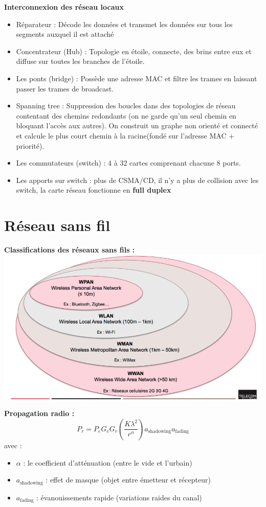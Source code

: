 \documentclass[a4paper,9pt, twocolumn]{article}
\begin{document}
	\textbf{Interconnexion des réseau locaux}
	\begin{itemize}
		\item Réparateur : Décode les données et transmet les données sur tous les segments auxquel il est attaché
		\item Concentrateur (Hub) : Topologie en étoile, connecte, des brins entre eux et diffuse sur toutes les branches de l'étoile.
		\item Les ponts (bridge) : Possède une adresse MAC et filtre les trames en  laissant passer les trames de broadcast.
		\item Spanning tree : Suppression des boucles dans des topologies de réseau contentant des chemins redondants (on ne garde qu'un seul chemin en bloquant l'accès aux autres).
			On construit un graphe non orienté et connecté et calcule le plus court chemin à la racine(fondé sur l'adresse MAC + priorité).
		\item Les commutateurs (switch) : 4 à 32 cartes comprenant chacune 8 ports.
		\item Les apports sur switch : plus de CSMA/CD, il n'y a plus de collision avec les switch, la carte réseau fonctionne en \textbf{full duplex}
	\end{itemize}


\section*{Réseau sans fil}

	\textbf{Classifications des réseaux sans fils :} 
	\includegraphics[scale=0.6]{res.png}
	
	\textbf{Propagation radio : } 
	$$P_{r} = P_{e} G_{e} G_{r} \left( \frac{K\lambda^{2}}{r^{\alpha}} \right) a_{\text{shadowing}} a_{\text{fading}}$$
	avec : 
	\begin{itemize}
		\item $\alpha$ : le coefficient d'atténuation (entre le vide et l'urbain)
		\item $a_{\text{shadowing}}$ : effet de masque (objet entre émetteur et récepteur)
		\item $a_{\text{fading}}$ : évanouissements rapide (variations raides du canal)
	\end{itemize}
	
\end{document}

